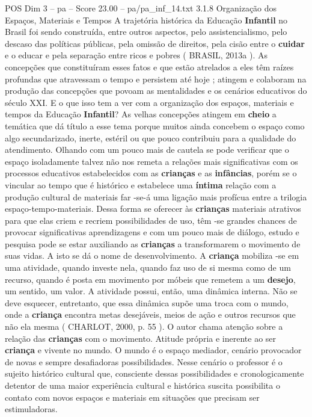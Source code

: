 \begin{textsample}{POS Dim 3 – pa – Score 23.00 – pa/pa\_inf\_14.txt}  \label{ex:f3_pos_231}
3.1.8 Organização dos Espaços, Materiais e Tempos A trajetória histórica da Educação \textbf{Infantil} no Brasil foi sendo construída, entre outros aspectos, pelo assistencialismo, pelo descaso das políticas públicas, pela omissão de direitos, pela cisão entre o \textbf{cuidar} e o educar e pela separação entre ricos e pobres ( BRASIL, 2013a ).
As concepções que constituíram esses fatos e que estão atrelados a eles têm raízes profundas que atravessam o tempo e persistem até hoje ; atingem e colaboram na produção das concepções que povoam as mentalidades e os cenários educativos do século XXI.
E o que isso tem a ver com a organização dos espaços, materiais e tempos da Educação \textbf{Infantil}?
As velhas concepções atingem em \textbf{cheio} a temática que dá título a esse tema porque muitos ainda concebem o espaço como algo secundarizado, inerte, estéril ou que pouco contribuiu para a qualidade do atendimento.
Olhando com um pouco mais de cautela se pode verificar que o espaço isoladamente talvez não nos remeta a relações mais significativas com os processos educativos estabelecidos com as \textbf{crianças} e as \textbf{infâncias}, porém se o vincular ao tempo que é histórico e estabelece uma \textbf{íntima} relação com a produção cultural de materiais far -se-á uma ligação mais profícua entre a trilogia espaço-tempo-materiais.
Dessa forma se oferecer às \textbf{crianças} materiais atrativos para que elas criem e recriem possibilidades de uso, têm -se grandes chances de provocar significativas aprendizagens e com um pouco mais de diálogo, estudo e pesquisa pode se estar auxiliando as \textbf{crianças} a transformarem o movimento de suas vidas.
A isto se dá o nome de desenvolvimento.
A \textbf{criança} mobiliza -se em uma atividade, quando investe nela, quando faz uso de si mesma como de um recurso, quando é posta em movimento por móbeis que remetem a um \textbf{desejo}, um sentido, um valor.
A atividade possui, então, uma dinâmica interna.
Não se deve esquecer, entretanto, que essa dinâmica supõe uma troca com o mundo, onde a \textbf{criança} encontra metas desejáveis, meios de ação e outros recursos que não ela mesma ( CHARLOT, 2000, p. 55 ).
O autor chama atenção sobre a relação das \textbf{crianças} com o movimento.
Atitude própria e inerente ao ser \textbf{criança} e vivente no mundo.
O mundo é o espaço mediador, cenário provocador de novas e sempre desafiadoras possibilidades.
Nesse cenário o professor é o sujeito histórico cultural que, consciente dessas possibilidades e cronologicamente detentor de uma maior experiência cultural e histórica suscita possibilita o contato com novos espaços e materiais em situações que precisam ser estimuladoras.

\end{textsample}
